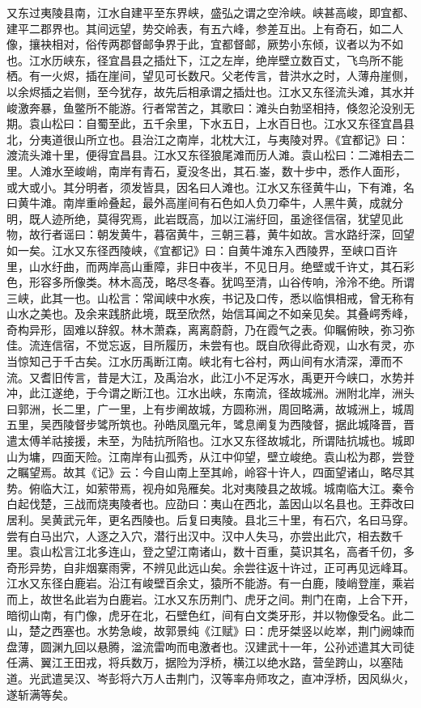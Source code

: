 \documentclass[12pt,UTF8]{ctexbook}
\begin{document}
又东过夷陵县南，江水自建平至东界峡，盛弘之谓之空泠峡。峡甚高峻，即宜都、建平二郡界也。其间远望，势交岭表，有五六峰，参差互出。上有奇石，如二人像，攘袂相对，俗传两郡督邮争界于此，宜都督邮，厥势小东倾，议者以为不如也。江水历峡东，径宜昌县之插灶下，江之左岸，绝岸壁立数百丈，飞鸟所不能栖。有一火烬，插在崖间，望见可长数尺。父老传言，昔洪水之时，人薄舟崖侧，以余烬插之岩侧，至今犹存，故先后相承谓之插灶也。江水又东径流头滩，其水并峻激奔暴，鱼鳖所不能游。行者常苦之，其歌曰：滩头白勃坚相持，倏忽沦没别无期。袁山松曰：自蜀至此，五千余里，下水五日，上水百日也。江水又东径宜昌县北，分夷道很山所立也。县治江之南岸，北枕大江，与夷陵对界。《宜都记》曰：渡流头滩十里，便得宜昌县。江水又东径狼尾滩而历人滩。袁山松曰：二滩相去二里。人滩水至峻峭，南岸有青石，夏没冬出，其石.崟，数十步中，悉作人面形，或大或小。其分明者，须发皆具，因名曰人滩也。江水又东径黄牛山，下有滩，名曰黄牛滩。南岸重岭叠起，最外高崖间有石色如人负刀牵牛，人黑牛黄，成就分明，既人迹所绝，莫得究焉，此岩既高，加以江湍纡回，虽途径信宿，犹望见此物，故行者谣曰：朝发黄牛，暮宿黄牛，三朝三暮，黄牛如故。言水路纡深，回望如一矣。江水又东径西陵峡，《宜都记》曰：自黄牛滩东入西陵界，至峡口百许里，山水纡曲，而两岸高山重障，非日中夜半，不见日月。绝壁或千许丈，其石彩色，形容多所像类。林木高茂，略尽冬春。犹鸣至清，山谷传响，泠泠不绝。所谓三峡，此其一也。山松言：常闻峡中水疾，书记及口传，悉以临惧相戒，曾无称有山水之美也。及余来践脐此境，既至欣然，始信耳闻之不如亲见矣。其叠崿秀峰，奇构异形，固难以辞叙。林木萧森，离离蔚蔚，乃在霞气之表。仰瞩俯映，弥习弥佳。流连信宿，不觉忘返，目所履历，未尝有也。既自欣得此奇观，山水有灵，亦当惊知己于千古矣。江水历禹断江南。峡北有七谷村，两山间有水清深，潭而不流。又耆旧传言，昔是大江，及禹治水，此江小不足泻水，禹更开今峡口，水势并冲，此江遂绝，于今谓之断江也。江水出峡，东南流，径故城洲。洲附北岸，洲头曰郭洲，长二里，广一里，上有步阐故城，方圆称洲，周回略满，故城洲上，城周五里，吴西陵督步骘所筑也。孙皓凤凰元年，骘息阐复为西陵督，据此城降晋，晋遣太傅羊祜接援，未至，为陆抗所陷也。江水又东径故城北，所谓陆抗城也。城即山为墉，四面天险。江南岸有山孤秀，从江中仰望，壁立峻绝。袁山松为郡，尝登之瞩望焉。故其《记》云：今自山南上至其岭，岭容十许人，四面望诸山，略尽其势。俯临大江，如萦带焉，视舟如凫雁矣。北对夷陵县之故城。城南临大江。秦令白起伐楚，三战而烧夷陵者也。应劭曰：夷山在西北，盖因山以名县也。王莽改曰居利。吴黄武元年，更名西陵也。后复曰夷陵。县北三十里，有石穴，名曰马穿。尝有白马出穴，人逐之入穴，潜行出汉中。汉中人失马，亦尝出此穴，相去数千里。袁山松言江北多连山，登之望江南诸山，数十百重，莫识其名，高者千仞，多奇形异势，自非烟寨雨霁，不辨见此远山矣。余尝往返十许过，正可再见远峰耳。江水又东径白鹿岩。沿江有峻壁百余丈，猿所不能游。有一白鹿，陵峭登崖，乘岩而上，故世名此岩为白鹿岩。江水又东历荆门、虎牙之间。荆门在南，上合下开，暗彻山南，有门像，虎牙在北，石壁色红，间有白文类牙形，并以物像受名。此二山，楚之西塞也。水势急峻，故郭景纯《江赋》曰：虎牙桀竖以屹崒，荆门阙竦而盘薄，圆渊九回以悬腾，湓流雷呴而电激者也。汉建武十一年，公孙述遣其大司徒任满、翼江王田戎，将兵数万，据险为浮桥，横江以绝水路，营垒跨山，以塞陆道。光武遣吴汉、岑彭将六万人击荆门，汉等率舟师攻之，直冲浮桥，因风纵火，遂斩满等矣。
\end{document}
